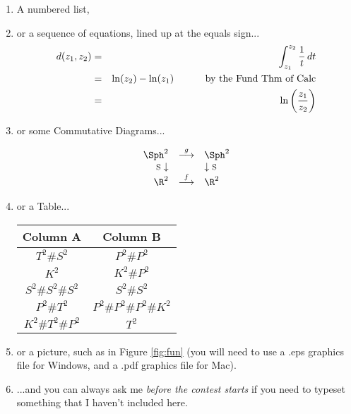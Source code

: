 \documentclass[12pt]{article}   %
\begin{document}
\begin{enumerate}
\item A numbered list,

\item or a sequence of equations, lined up at the equals sign...
\begin{eqnarray*}   %
d(z_1,z_2) & = & \int_{z_1}^{z_2} \frac{1}{t} \, dt \\
& = & \ln(z_2) - \ln(z_1) \mbox{\hspace{1cm} by the Fund Thm of Calc}\\
& = & \ln\left(\frac{z_1}{z_2}\right) \\ %
\end{eqnarray*}

\item or some Commutative Diagrams...

$$\begin{array}{rcl}
\Sph^2  & \stackrel{g}{\longrightarrow} & \Sph^2 \\
\mbox{\footnotesize{S}} \downarrow & & \downarrow \mbox{\footnotesize{S}} \\
\R^2 & \stackrel{f}{\longrightarrow} & \R^2 \\
\end{array}$$

\item or a Table...

\begin{center}
\begin{tabular}{|c|c|}
\hline 
Column A & Column B \\ 
\hline
$T^2 \# S^2$ & $P^2 \# P^2$ \\
$K^2$ & $K^2 \# P^2$ \\
$S^2 \# S^2 \# S^2$ & $S^2 \# S^2$ \\
$P^2 \# T^2$ & $P^2 \# P^2 \# P^2 \# K^2$ \\
$K^2 \# T^2 \# P^2$ & $T^2$ \\
\hline
\end{tabular}
\end{center}

\item or a picture, such as in Figure \ref{fig:fun} (you will need to use a .eps graphics file for Windows, and a .pdf graphics
file for Mac).



\item  ...and you can always ask me {\it before the contest starts} if you need to typeset something that I haven't
included here.
\end{enumerate}
\end{document}
